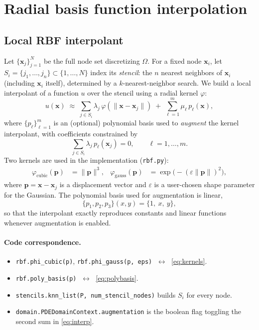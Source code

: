 \documentclass[11pt]{article}
\newcommand{\bp}{\mathbf{p}}
\newcommand{\bx}{\mathbf{x}}
\begin{document}
\section{Radial basis function interpolation}

\subsection{Local RBF interpolant}

Let $\{\bx_j\}_{j=1}^{N}$ be the full node set discretizing $\Omega$.
For a fixed node $\bx_i$, let $S_i = \{j_1,\dots,j_n\} \subset
\{1,\dots,N\}$ index its \emph{stencil}: the $n$ nearest neighbors of
$\bx_i$ (including $\bx_i$ itself), determined by a $k$-nearest-neighbor
search. We build a local interpolant of a function $u$ over the
stencil using a radial kernel $\varphi$:
\begin{equation}
  u(\bx) \;\approx\; \sum_{j \in S_i} \lambda_j\, \varphi(\|\bx - \bx_j\|)
  \;+\; \sum_{\ell=1}^{m} \mu_\ell\, p_\ell(\bx),
  \label{eq:interp}
\end{equation}
where $\{p_\ell\}_{\ell=1}^m$ is an (optional) polynomial basis used to
\emph{augment} the kernel interpolant, with coefficients constrained by
\begin{equation}
  \sum_{j \in S_i} \lambda_j\, p_\ell(\bx_j) = 0, \qquad \ell = 1,\dots,m.
  \label{eq:augment-constraint}
\end{equation}
Two kernels are used in the implementation (\texttt{rbf.py}):
\begin{align}
  \varphi_{\text{cubic}}(\bp) &= \|\bp\|^3,
  &\varphi_{\text{gauss}}(\bp) &= \exp\!\big(-(\varepsilon\|\bp\|)^2\big),
  \label{eq:kernels}
\end{align}
where $\bp = \bx - \bx_j$ is a displacement vector and $\varepsilon$ is
a user-chosen shape parameter for the Gaussian. The polynomial basis
used for augmentation is linear,
\begin{equation}
  \{p_1, p_2, p_3\}(x,y) = \{1,\ x,\ y\},
  \label{eq:polybasis}
\end{equation}
so that the interpolant exactly reproduces constants and linear
functions whenever augmentation is enabled.

\paragraph{Code correspondence.}
\begin{itemize}[leftmargin=2em]
  \item \texttt{rbf.phi\_cubic(p)}, \texttt{rbf.phi\_gauss(p, eps)}
        $\;\leftrightarrow\;$ \eqref{eq:kernels}.
  \item \texttt{rbf.poly\_basis(p)} $\;\leftrightarrow\;$
        \eqref{eq:polybasis}.
  \item \texttt{stencils.knn\_list(P, num\_stencil\_nodes)} builds $S_i$ for every node.
  \item \texttt{domain.PDEDomainContext.augmentation} is the boolean
        flag toggling the second sum in \eqref{eq:interp}.
\end{itemize}
\end{document}
